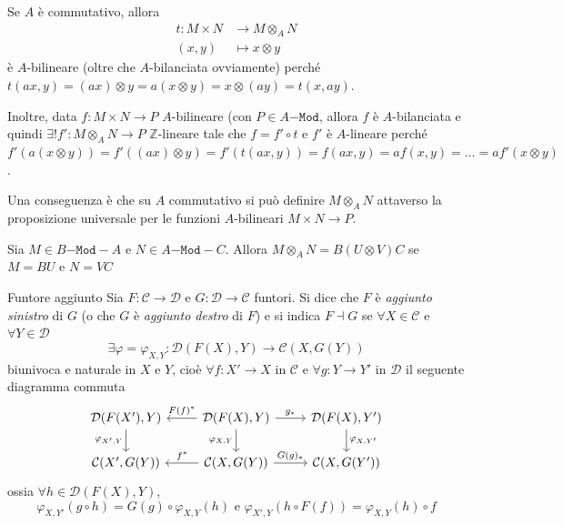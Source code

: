 \begin{remark}{}
    Se \(A\) è commutativo, allora 
    \begin{align*}
        t : M \times N &\to M \otimes_A N \\
        {(x, y)} & \mapsto x \otimes y
    \end{align*}
    è \(A\)-bilineare (oltre che \(A\)-bilanciata ovviamente) perché
    \(t {(ax, y)} = {(ax)} \otimes y = a{(x \otimes y)} = x \otimes {(ay)} =
    t{(x, ay)}\).

    Inoltre, data \(f: M \times N \to P\) \(A\)-bilineare (con \(P \in
    A\mathtt{-Mod}\), allora \(f\) è \(A\)-bilanciata e quindi \(\exists! f' :
    M \otimes_A N \to P\) \(\mathbb{Z}\)-lineare tale che \(f = f' \circ t\)  e
    \(f'\) è \(A\)-lineare perché \(f'{(a{(x \otimes y)})} = f'{({(ax)} \otimes
    y)} = f'{(t{(ax, y)})} = f{(ax, y)} = a f{(x, y)} = \dots = af'{(x \otimes
    y)}\).

    Una conseguenza è che su \(A\) commutativo si può definire \(M \otimes_A N\)
    attaverso la proposizione universale per le funzioni \(A\)-bilineari \(M
    \times N \to P\).
\end{remark}

\begin{remark}{}
    Sia \(M \in B\mathtt{-Mod-}A\) e \(N \in A\mathtt{-Mod-}C\). Allora \(M
    \otimes_A N = B {(U \otimes V)}C \) se \(M = B U \) e \(N = VC\) 
\end{remark}

\begin{definition}{Funtore aggiunto}
    Sia \(F : \mathcal{C} \to \mathcal{D}\) e \(G : \mathcal{D} \to
    \mathcal{C}\) funtori. Si dice che \(F\) è \emph{aggiunto sinistro} di
    \(G\) (o che \(G\) è \emph{aggiunto destro} di \(F\)) e si indica \(F \dashv
    G\) se \(\forall X \in \mathcal{C}\) e \(\forall Y \in \mathcal{D}\)
    \[
      \exists \varphi = \varphi_{X,Y} : \mathcal{D}{(F{(X)}, Y)} \to
      \mathcal{C}{(X, G{(Y)})}
    \]
    biunivoca e naturale in \(X\) e \(Y\), cioè \(\forall f : X' \to X\) in
    \(\mathcal{C}\) e \(\forall g : Y \to Y'\) in \(\mathcal{D}\) il seguente
    diagramma commuta
    \[\begin{tikzcd}
        \mathcal{D}{(F{(X')}, Y)} & \mathcal{D}{(F{(X)}, Y)} &
        \mathcal{D}{(F{(X)}, Y')} \\
        \mathcal{C}{(X', G{(Y)})} & \mathcal{C}{(X, G{(Y)})} & \mathcal{C}{(X,
        G{(Y')})}
        \arrow["{\varphi_{X', Y}}"', from=1-1, to=2-1]
        \arrow["{F(f)^*}"', from=1-2, to=1-1]
        \arrow["{g_*}", from=1-2, to=1-3]
        \arrow["{\varphi_{X,Y}}"', from=1-2, to=2-2]
        \arrow["{\varphi_{X, Y'}}", from=1-3, to=2-3]
        \arrow["{f^*}"', from=2-2, to=2-1]
        \arrow["{G(g)_*}", from=2-2, to=2-3]
    \end{tikzcd}\]
    ossia \(\forall h \in \mathcal{D}{(F{(X)}, Y)}\), \[\varphi_{X, Y'}  {(g \circ h)} =
    G{(g)} \circ \varphi_{X, Y}  {(h)} \text{ e } \varphi _{X',Y} {(h \circ F{(f)})}
    = \varphi _{X, Y} {(h)}
    \circ f\] 
\end{definition}

